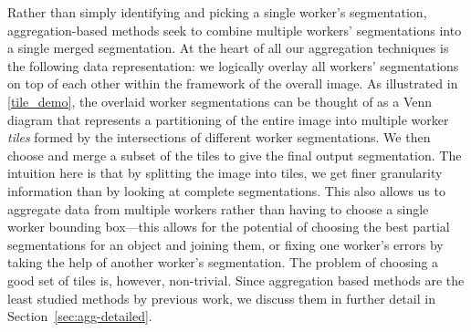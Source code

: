 

Rather than simply identifying and picking a single worker's segmentation, aggregation-based methods seek to combine multiple workers' segmentations into a single merged segmentation. At the heart of all our aggregation techniques is the following data representation: we logically overlay all workers' segmentations on top of each other within the framework of the overall image. As illustrated in \ref{tile_demo}, the overlaid worker segmentations can be thought of as a Venn diagram that represents a partitioning of the entire image into multiple worker {\em tiles} formed by the intersections of different worker segmentations. We then choose and merge a subset of the tiles to give the final output segmentation. The intuition here is that by splitting the image into tiles, we get finer granularity information than by looking at complete segmentations. This also allows us to aggregate data from multiple workers rather than having to choose a single worker bounding box---this allows for the potential of choosing the best partial segmentations for an object and joining them, or fixing one worker's errors by taking the help of another worker's segmentation. The problem of choosing a good set of tiles is, however, non-trivial.
Since aggregation based methods are the least studied methods by previous work, we discuss them in further detail in Section~\ref{sec:agg-detailed}.
